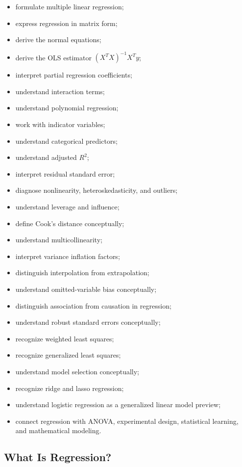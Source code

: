 {\begin{itemize}
    \item formulate multiple linear regression;
    \item express regression in matrix form;
    \item derive the normal equations;
    \item derive the OLS estimator
          \((X^TX)^{-1}X^Ty\);
    \item interpret partial regression coefficients;
    \item understand interaction terms;
    \item understand polynomial regression;
    \item work with indicator variables;
    \item understand categorical predictors;
    \item understand adjusted \(R^2\);
    \item interpret residual standard error;
    \item diagnose nonlinearity, heteroskedasticity, and outliers;
    \item understand leverage and influence;
    \item define Cook's distance conceptually;
    \item understand multicollinearity;
    \item interpret variance inflation factors;
    \item distinguish interpolation from extrapolation;
    \item understand omitted-variable bias conceptually;
    \item distinguish association from causation in regression;
    \item understand robust standard errors conceptually;
    \item recognize weighted least squares;
    \item recognize generalized least squares;
    \item understand model selection conceptually;
    \item recognize ridge and lasso regression;
    \item understand logistic regression as a generalized linear model
          preview;
    \item connect regression with ANOVA, experimental design,
          statistical learning, and mathematical modeling.
\end{itemize}
}

\subsection{What Is Regression?}
\label{subsec:what-is-regression}


